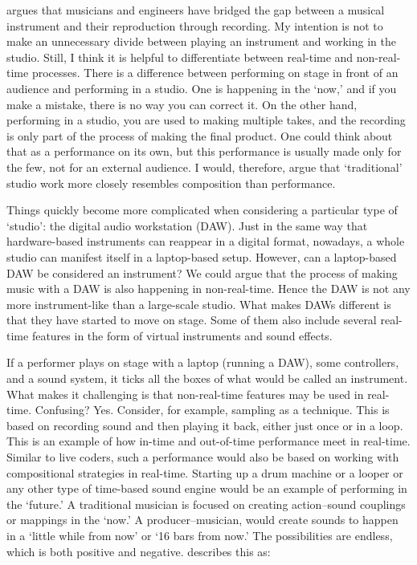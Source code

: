 \citet{sterne_audible_2003} argues that musicians and engineers have bridged the gap between a musical instrument and their reproduction through recording.
My intention is not to make an unnecessary divide between playing an instrument and working in the studio. Still, I think it is helpful to differentiate between real-time and non-real-time processes. There is a difference between performing on stage in front of an audience and performing in a studio. One is happening in the `now,' and if you make a mistake, there is no way you can correct it. On the other hand, performing in a studio, you are used to making multiple takes, and the recording is only part of the process of making the final product. One could think about that as a performance on its own, but this performance is usually made only for the few, not for an external audience. I would, therefore, argue that `traditional' studio work more closely resembles composition than performance.

Things quickly become more complicated when considering a particular type of `studio': the digital audio workstation (DAW). Just in the same way that hardware-based instruments can reappear in a digital format, nowadays, a whole studio can manifest itself in a laptop-based setup. However, can a laptop-based DAW be considered an instrument? We could argue that the process of making music with a DAW is also happening in non-real-time. Hence the DAW is not any more instrument-like than a large-scale studio. What makes DAWs different is that they have started to move on stage. Some of them also include several real-time features in the form of virtual instruments and sound effects.

If a performer plays on stage with a laptop (running a DAW), some controllers, and a sound system, it ticks all the boxes of what would be called an instrument. What makes it challenging is that non-real-time features may be used in real-time. Confusing? Yes. Consider, for example, sampling as a technique. This is based on recording sound and then playing it back, either just once or in a loop. This is an example of how in-time and out-of-time performance meet in real-time. Similar to live coders, such a performance would also be based on working with compositional strategies in real-time. Starting up a drum machine or a looper or any other type of time-based sound engine would be an example of performing in the `future.' A traditional musician is focused on creating action--sound couplings or mappings in the `now.' A producer--musician, would create sounds to happen in a `little while from now' or `16 bars from now.' The possibilities are endless, which is both positive and negative. \citet[p.62]{magnusson_designing_2010} describes this as:

